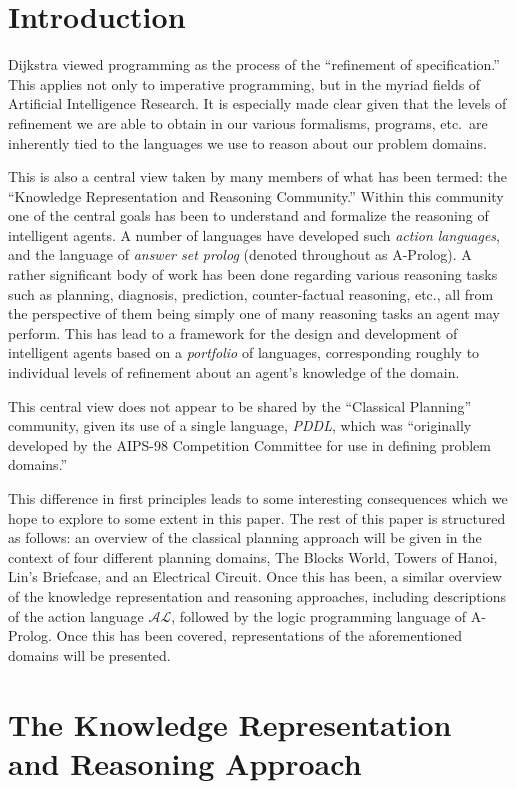 \documentclass{article}
\newcommand{\AL}{\ensuremath{\mathcal{AL}}}
\begin{document}
\section{Introduction}

Dijkstra viewed programming as the process of the ``refinement of specification.'' This applies not only to imperative programming, but in the myriad fields of Artificial Intelligence Research. It is especially made clear given that the levels of refinement we are able to obtain in our various formalisms, programs, etc.\, are inherently tied to the languages we use to reason about our problem domains.

This is also a central view taken by many members of what has been termed: the ``Knowledge Representation and Reasoning Community.'' Within this community one of the central goals has been to understand and formalize the reasoning of intelligent agents. A number of languages have developed such \emph{action languages}, and the language of \emph{answer set prolog} (denoted throughout as A-Prolog). A rather significant body of work has been done regarding various reasoning tasks such as planning, diagnosis, prediction, counter-factual reasoning, etc., all from the perspective of them being simply one of many reasoning tasks an agent may perform. This has lead to a framework for the design and development of intelligent agents based on a \emph{portfolio} of languages, corresponding roughly to individual levels of refinement about an agent's knowledge of the domain.

This central view does not appear to be shared by the ``Classical Planning'' community, given its use of a single language, \emph{PDDL}, which was ``originally developed by the AIPS-98 Competition Committee for use in defining problem domains.''

This difference in first principles leads to some interesting consequences which we hope to explore to some extent in this paper. The rest of this paper is structured as follows: an overview of the classical planning approach will be given in the context of four different planning domains, The Blocks World, Towers of Hanoi, Lin's Briefcase, and an Electrical Circuit. Once this has been, a similar overview of the knowledge representation and reasoning approaches, including descriptions of the action language $\AL$, followed by the logic programming language of A-Prolog. Once this has been covered, representations of the aforementioned domains will be presented.

\section{The Knowledge Representation and Reasoning Approach}
\end{document}
